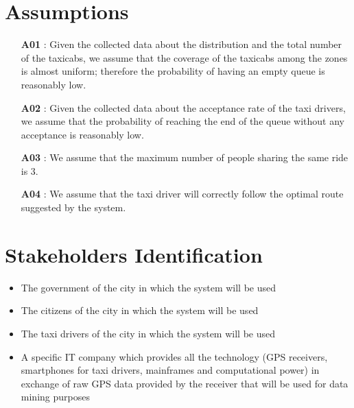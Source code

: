 \section{Assumptions} \label{assump}
\begin{itemize}
	\item [\textbf{A01}]: Given the collected data about the distribution and the total number of the taxicabs, we assume that the coverage of the taxicabs among the zones is almost uniform; therefore the probability of having an empty queue is reasonably low.
	\item [\textbf{A02}]: Given the collected data about the acceptance rate of the taxi drivers, we assume that the probability of reaching the end of the queue without any acceptance is reasonably low.
	\item [\textbf{A03}]: We assume that the maximum number of people sharing the same ride is 3.
	\item [\textbf{A04}]: We assume that the taxi driver will correctly follow the optimal route suggested by the system.
\end{itemize}

\section{Stakeholders Identification}
\begin{itemize}
	\item The government of the city in which the system will be used
	\item The citizens of the city in which the system will be used
	\item The taxi drivers of the city in which the system will be used
	\item A specific IT company which provides all the technology (GPS receivers, smartphones for taxi drivers, mainframes and computational power) in exchange of raw GPS data provided by the receiver that will be used for data mining purposes
\end{itemize}

